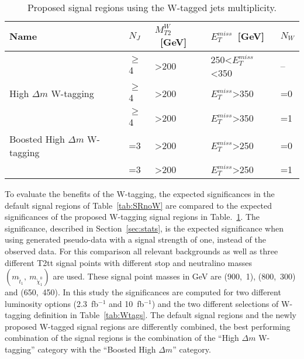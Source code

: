\begin{table}[h]
\begin{center}
\begin{tabular}{|l|l|l|l|l|}
\hline
Name            & $N_{J}$  & $M_{T2}^{W}$~[GeV]            & $E_{T}^{miss}$~[GeV]    & $N_{W}$ \\
\hline
\hline
                          & $\geq$4  & >200                & 250<$E_{T}^{miss}$<350   & --   \\
High $\Delta m$ W-tagging & $\geq$4  & >200                & $E_{T}^{miss}$>350       & =0    \\
                          & $\geq$4  & >200                & $E_{T}^{miss}$>350       & =1    \\
\hline
Boosted High $\Delta m$ W-tagging & =3  & >200              & $E_{T}^{miss}$>250 & =0  \\
                                  & =3  & >200              & $E_{T}^{miss}$>250 & =1  \\
\hline
\end{tabular}
\caption[Table caption text]{ Proposed signal regions using the W-tagged jets multiplicity. }
\label{tab:SRW}
\end{center}
\end{table}

To evaluate the benefits of the W-tagging, the expected significances in the default signal regions of Table~\ref{tab:SRnoW} are compared to the expected significances of the proposed W-tagging signal regions in Table.~\ref{tab:SRW}. The significance, described in Section~\ref{sec:stats}, is the expected significance when using generated pseudo-data with a signal strength of one, instead of the observed data. For this comparison all relevant backgrounds as well as three different T2tt signal points with different stop and neutralino masses $(m_{\tilde{t}_{1}},~m_{\tilde{\chi}^{0}_{1}})$ are used. These signal point masses in GeV are (900,~1), (800,~300) and (650,~450). In this study the significances are computed for two different luminosity options (2.3~fb$^{-1}$ and 10~fb$^{-1}$) and the two different selections of W-tagging definition in Table~\ref{tab:Wtags}. The default signal regions and the newly proposed W-tagged signal regions are differently combined, the best performing combination of the signal regions is  the combination of the ``High $\Delta m$ W-tagging'' category with the ``Boosted High $\Delta m$'' category.

